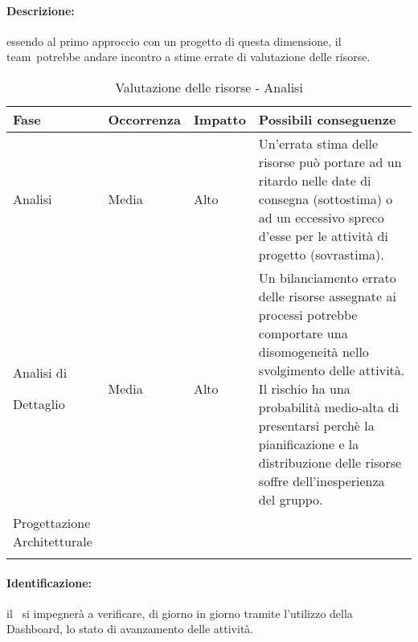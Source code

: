 \documentclass[../PianoProgetto.tex]{subfiles}
\begin{document}
	\paragraph*{Descrizione:} essendo al primo approccio con un progetto di questa dimensione, il team\g\ potrebbe andare incontro a stime errate di valutazione delle risorse.
	
	
	\begin{table}[h]
		\centering
		\begin{tabularx}{\textwidth}{F O O P}
			\toprule
			\textbf{Fase} & \textbf{Occorrenza} & \textbf{Impatto} & \textbf{Possibili conseguenze}\\
			\midrule
			Analisi & Media & Alto & Un'errata stima delle risorse può portare ad un ritardo nelle date di consegna (sottostima) o ad un eccessivo spreco d'esse per le attività di progetto (sovrastima). \\
			\midrule
			Analisi di \par Dettaglio & Media & Alto & Un bilanciamento errato delle risorse assegnate ai processi potrebbe comportare una disomogeneità nello svolgimento delle attività. Il rischio ha una probabilità medio-alta di presentarsi perchè la pianificazione e la distribuzione delle risorse soffre dell'inesperienza del gruppo. \\
			\midrule
			Progettazione Architetturale & & & \\
			\bottomrule
		\end{tabularx}
		\caption{Valutazione delle risorse - Analisi}
		\label{tab:Valutazione delle risorse - Analisi}	
	\end{table}
	
	\paragraph*{Identificazione:} il \responsabilediprogetto\ si impegnerà a verificare, di giorno in giorno tramite l'utilizzo della Dashboard\g, lo stato di avanzamento delle attività.
	
\end{document}
